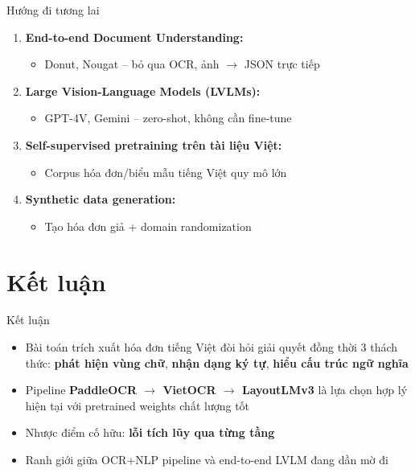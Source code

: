 \documentclass[aspectratio=169, 10pt]{beamer}
\begin{document}
\begin{frame}{Hướng đi tương lai}
 \begin{enumerate}
 \item[$\bullet$] \textbf{End-to-end Document Understanding:}
 \begin{itemize}
 \item Donut, Nougat -- bỏ qua OCR, ảnh $\rightarrow$ JSON trực tiếp
 \end{itemize}
 \item[$\bullet$] \textbf{Large Vision-Language Models (LVLMs):}
 \begin{itemize}
 \item GPT-4V, Gemini -- zero-shot, không cần fine-tune
 \end{itemize}
 \item[$\bullet$] \textbf{Self-supervised pretraining trên tài liệu Việt:}
 \begin{itemize}
 \item Corpus hóa đơn/biểu mẫu tiếng Việt quy mô lớn
 \end{itemize}
 \item[$\bullet$] \textbf{Synthetic data generation:}
 \begin{itemize}
 \item Tạo hóa đơn giả + domain randomization
 \end{itemize}
 \end{enumerate}
\end{frame}

\section{Kết luận}

\begin{frame}{Kết luận}
 \begin{itemize}
 \item[$\bullet$] Bài toán trích xuất hóa đơn tiếng Việt đòi hỏi giải quyết đồng thời 3 thách thức: \textbf{phát hiện vùng chữ}, \textbf{nhận dạng ký tự}, \textbf{hiểu cấu trúc ngữ nghĩa}
 \vspace{0.2cm}
 \item[$\bullet$] Pipeline \textbf{\textcolor{accent}{PaddleOCR $\rightarrow$ VietOCR $\rightarrow$ LayoutLMv3}} là lựa chọn hợp lý hiện tại với pretrained weights chất lượng tốt
 \vspace{0.2cm}
 \item[$\bullet$] Nhược điểm cố hữu: \textbf{\textcolor{danger}{lỗi tích lũy qua từng tầng}}
 \vspace{0.2cm}
 \item[$\bullet$] Ranh giới giữa OCR+NLP pipeline và end-to-end LVLM đang dần mờ đi
 \end{itemize}
\end{frame}
\end{document}
